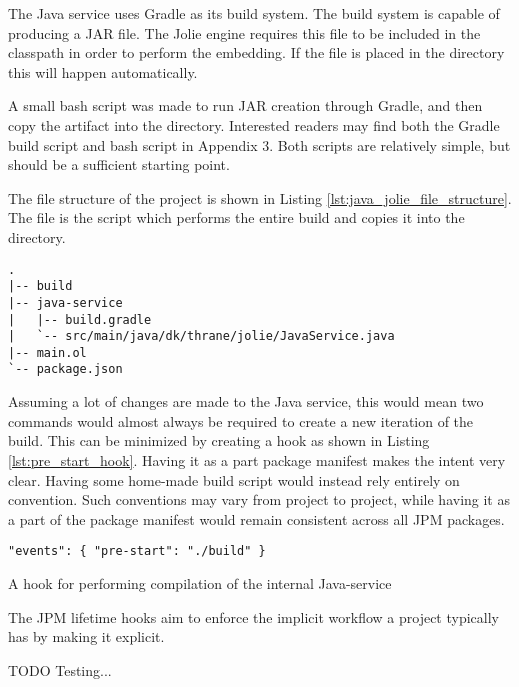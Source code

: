 The Java service uses Gradle as its build system. The build system is capable
of producing a JAR file. The Jolie engine requires this file to be included in
the classpath in order to perform the embedding. If the file is placed in the
 directory this will happen automatically.

A small bash script was made to run JAR creation through Gradle, and then copy
the artifact into the  directory. Interested readers may find both
the Gradle build script and bash script in Appendix 3. Both scripts are
relatively simple, but should be a sufficient starting point.

The file structure of the project is shown in Listing
\ref{lst:java_jolie_file_structure}. The  file is the script which
performs the entire build and copies it into the  directory.

\begin{listing}[H]
\begin{verbatim}
.
|-- build
|-- java-service
|   |-- build.gradle
|   `-- src/main/java/dk/thrane/jolie/JavaService.java
|-- main.ol
`-- package.json
\end{verbatim}
\caption{}
\label{lst:java_jolie_file_structure}
\end{listing}

Assuming a lot of changes are made to the Java service, this would mean two
commands would almost always be required to create a new iteration of the
build. This can be minimized by creating a  hook as shown in
Listing \ref{lst:pre_start_hook}. Having it as a part package manifest makes
the intent very clear. Having some home-made build script would instead rely
entirely on convention. Such conventions may vary from project to project,
while having it as a part of the package manifest would remain consistent
across all JPM packages.

\begin{listing}[H]
\begin{verbatim}
"events": { "pre-start": "./build" }
\end{verbatim}
\caption{A  hook for performing compilation of the internal
    Java-service}
\label{lst:pre_start_hook}
\end{listing}

The JPM lifetime hooks aim to enforce the implicit workflow a project typically
has by making it explicit.

TODO Testing...
